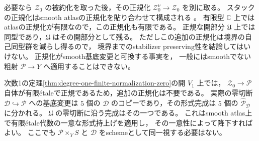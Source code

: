 \begin{remark}[正規スタックを要求する場合]
必要なら $\mathcal Z_0$ の被約化を取った後，その正規化
$\mathcal Z_0^\nu\to\mathcal Z_0$ を別に取る。
スタックの正規化はsmooth atlasの正規化を貼り合わせて構成される
\cite[Tag 0GMJ]{StacksProject}。
有限型 $\mathbb C$ 上ではatlasの正規化が有限なので，この正規化も有限である。
正規な開部分 $\mathfrak U$ 上では同型であり，$\mathfrak U$ はその開部分として残る。
ただしこの追加の正規化は境界の自己同型群を減らし得るので，
境界までのstabilizer preserving性を結論してはいけない。
正規化がsmooth基底変更と可換する事実\cite[Tag 081J]{StacksProject}を，
一般にはsmoothでない粗射 $\mathcal P\to Y$ へ適用することはできない。
\end{remark}

\begin{remark}[有限\'{e}tale領域でのスタックの形式分裂]
次数1の定理\ref{thm:degree-one-finite-normalization-zero}の開 $V_1$ 上では，
$\mathcal Z_0\to\mathcal P$ 自体が有限\'{e}taleで正規であるため，追加の正規化は不要である。
実際の零切断 $\mathcal D\hookrightarrow\mathcal P$ への基底変更は
$5$ 個の $\mathcal D$ のコピーであり，その形式完成は
$5$ 個の $\widehat{\mathcal P}_{\mathcal D}$ に分かれる。
$\mathfrak U$ の零切断に沿う完成はその一つである。
これはsmooth atlas上で有限\'{e}tale代数の一意な形式持上げを適用し，
その一意性によって降下すればよい。
ここでも $\mathcal P\times_Y S$ と $\mathcal D$ をschemeとして同一視する必要はない。
\end{remark}
